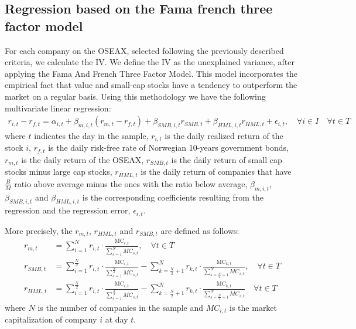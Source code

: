 \subsection*{Regression based on the Fama french three factor model} For each company on the OSEAX, selected following the previously described criteria, we calculate the IV. We define the IV as the unexplained variance, after applying the Fama And French Three Factor Model. This model incorporates the empirical fact that value and small-cap stocks have a tendency to outperform the market on a regular basis. Using this methodology we have the following multivariate linear regression:
\begin{align} 
    r_{i,t} - r_{f,t}= \alpha_{i,t} + \beta_{m,i,t}(r_{m,t} - r_{f,t}) + \beta_{SMB,i,t}r_{SMB,t} + \beta_{HML,i,t}r_{HML,t} + \epsilon_{i,t}, \quad  \forall i \in I \quad  \forall t \in T 
    \label{FFregression}
\end{align}
where $t$ indicates the day in the sample, $r_{i,t}$ is the daily realized return of the stock $i$, $r_{f,t}$ is the daily risk-free rate of Norwegian 10-years government bonds, $r_{m,t}$ is the daily return of the OSEAX, $r_{SMB,t}$ is the daily return of small cap stocks minus large cap stocks, $r_{HML,t}$ is the daily return of companies that have $\frac{B}{M}$ ratio above average minus the ones with the ratio below average, $\beta_{m,i,t}$, $\beta_{SMB,i,t}$ and $\beta_{HML,i,t}$ is the corresponding coefficients resulting from the regression and the regression error, $\epsilon_{i,t}$.

More precisely, the $r_{m,t}$, $r_{HML,t}$ and $r_{SMB,t}$ are defined as follows:
\begin{align}
    r_{m,t} &= \sum_{i=1}^{N} r_{i,t} \cdot \frac{\text{MC}_{i,t}}{\sum_{s=1}^{N} MC_{s,t}},  \quad  \forall t \in T \\
    r_{SMB,t} &= \sum_{i=1}^{\frac{N}{2}} r_{i,t} \cdot \frac{\text{MC}_{i,t}}{\sum_{s=1}^{\frac{N}{2}} MC_{s,t}} - \sum_{k=\frac{N}{2}+1}^{N} r_{k,t} \cdot \frac{\text{MC}_{k,t}}{\sum_{s={\frac{N}{2}+1}}^{N} MC_{s,t}}, \quad  \forall t \in T \\
    r_{HML,t} &= \sum_{i=1}^{\frac{N}{2}} r_{i,t} \cdot \frac{\text{MC}_{i,t}}{\sum_{s=1}^{\frac{N}{2}} MC_{s,t}} - \sum_{k=\frac{N}{2}+1}^{N} r_{k,t} \cdot \frac{\text{MC}_{k,t}}{\sum_{s=\frac{N}{2}+1}^{N} MC_{s,t}} \quad  \forall t \in T
\end{align}
where $N$ is the number of companies in the sample and $MC_{i,t}$ is the market capitalization of company $i$ at day $t$.

